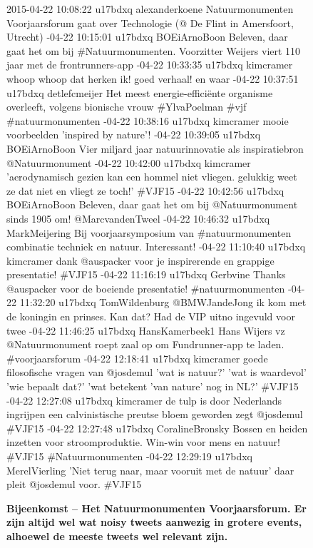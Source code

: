{{\begin{figure}[H]
 \caption{\bf{Bijeenkomst} – Het Natuurmonumenten Voorjaarsforum. Er zijn altijd wel wat noisy tweets aanwezig in grotere events, alhoewel de meeste tweets wel relevant zijn.}
\vspace*{-15pt} 
\begin{framed}
\footnotesize{
2015-04-22 10:08:22 u17bdxq alexanderkoene Natuurmonumenten Voorjaarsforum gaat over Technologie (@ De Flint in Amersfoort, Utrecht)
-04-22 10:15:01 u17bdxq BOEiArnoBoon Beleven, daar gaat het om bij \#Natuurmonumenten. Voorzitter Weijers viert 110 jaar met de frontrunners-app
-04-22 10:33:35 u17bdxq kimcramer whoop whoop dat herken ik! goed verhaal! en waar
-04-22 10:37:51 u17bdxq detlefcmeijer Het meest energie-efficiënte organisme overleeft, volgens bionische vrouw \#YlvaPoelman \#vjf \#natuurmonumenten
-04-22 10:38:16 u17bdxq kimcramer mooie voorbeelden 'inspired by nature'!
-04-22 10:39:05 u17bdxq BOEiArnoBoon Vier miljard jaar natuurinnovatie als inspiratiebron @Natuurmonument
-04-22 10:42:00 u17bdxq kimcramer 'aerodynamisch gezien kan een hommel niet vliegen. gelukkig weet ze dat niet en vliegt ze toch!' \#VJF15
-04-22 10:42:56 u17bdxq BOEiArnoBoon Beleven, daar gaat het om bij @Natuurmonument sinds 1905 om! @MarcvandenTweel
-04-22 10:46:32 u17bdxq MarkMeijering Bij voorjaarsymposium van \#natuurmonumenten combinatie techniek en natuur. Interessant!
-04-22 11:10:40 u17bdxq kimcramer dank @auspacker voor je inspirerende en grappige presentatie! \#VJF15
-04-22 11:16:19 u17bdxq Gerbvine Thanks @auspacker voor de boeiende presentatie! \#natuurmonumenten
-04-22 11:32:20 u17bdxq TomWildenburg @BMWJandeJong ik kom met de koningin en prinses. Kan dat? Had de VIP uitno ingevuld voor twee
-04-22 11:46:25 u17bdxq HansKamerbeek1 Hans Wijers vz @Natuurmonument roept zaal op om Fundrunner-app te laden. \#voorjaarsforum
-04-22 12:18:41 u17bdxq kimcramer goede filosofische vragen van @josdemul 'wat is natuur?' 'wat is waardevol' 'wie bepaalt dat?' 'wat betekent 'van nature' nog in NL?' \#VJF15
-04-22 12:27:08 u17bdxq kimcramer de tulp is door Nederlands ingrijpen een calvinistische preutse bloem geworden zegt @josdemul \#VJF15
-04-22 12:27:48 u17bdxq CoralineBronsky Bossen en heiden inzetten voor stroomproduktie. Win-win voor mens en natuur! \#VJF15 \#Natuurmonumenten
-04-22 12:29:19 u17bdxq MerelVierling 'Niet terug naar, maar vooruit met de natuur' daar pleit @josdemul voor. \#VJF15
}
\end{framed}
\end{figure}}}

